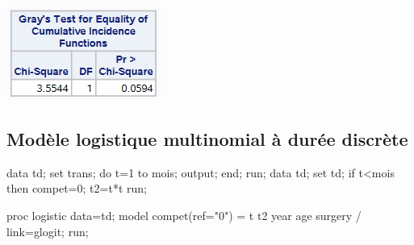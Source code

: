 \documentclass[
  12pt,
  letterpaper,
  DIV=11,
  numbers=noendperiod,
  onepage,
  openany]{scrreprt}
\newenvironment{Shaded}{\begin{snugshade}}{\end{snugshade}}
\newcommand{\AttributeTok}[1]{\textcolor[rgb]{0.80,0.80,0.80}{#1}}
\newcommand{\ControlFlowTok}[1]{\textcolor[rgb]{0.94,0.87,0.69}{#1}}
\newcommand{\DecValTok}[1]{\textcolor[rgb]{0.86,0.86,0.80}{#1}}
\newcommand{\FunctionTok}[1]{\textcolor[rgb]{0.94,0.94,0.56}{#1}}
\newcommand{\NormalTok}[1]{\textcolor[rgb]{0.80,0.80,0.80}{#1}}
\newcommand{\OtherTok}[1]{\textcolor[rgb]{0.94,0.94,0.56}{#1}}
\newcommand{\SpecialCharTok}[1]{\textcolor[rgb]{0.86,0.64,0.64}{#1}}
\newcommand{\StringTok}[1]{\textcolor[rgb]{0.80,0.58,0.58}{#1}}
\begin{document}
\includegraphics{sas/9g.PNG}

\hypertarget{moduxe8le-logistique-multinomial-uxe0-duruxe9e-discruxe8te}{%
\subsection{Modèle logistique multinomial à durée
discrète}\label{moduxe8le-logistique-multinomial-uxe0-duruxe9e-discruxe8te}}

\begin{Shaded}
\begin{Highlighting}[]
\NormalTok{data td; set trans; }
\NormalTok{do t}\OtherTok{=}\DecValTok{1}\NormalTok{ to mois; }
\NormalTok{     output; }
\NormalTok{     end; }
\NormalTok{run;}
\NormalTok{data td; set td;}
\ControlFlowTok{if}\NormalTok{ t}\SpecialCharTok{\textless{}}\NormalTok{mois then compet}\OtherTok{=}\DecValTok{0}\NormalTok{;}
\NormalTok{t2}\OtherTok{=}\NormalTok{t}\SpecialCharTok{*}\NormalTok{t}
\NormalTok{run;}
\end{Highlighting}
\end{Shaded}

\begin{Shaded}
\begin{Highlighting}[]
\NormalTok{proc logistic data}\OtherTok{=}\NormalTok{td;}
\NormalTok{model }\FunctionTok{compet}\NormalTok{(}\AttributeTok{ref=}\StringTok{"0"}\NormalTok{) }\OtherTok{=}\NormalTok{ t t2 year age surgery }\SpecialCharTok{/}\NormalTok{ link}\OtherTok{=}\NormalTok{glogit;}
\NormalTok{run;}
\end{Highlighting}
\end{Shaded}
\end{document}
